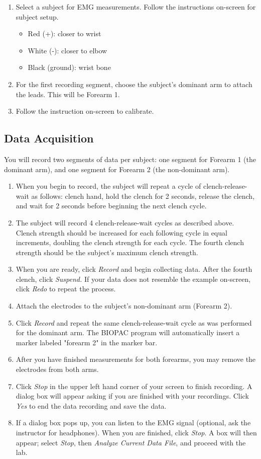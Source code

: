 \documentclass{article}
\begin{document}
\begin{enumerate}
	\item Select a subject for EMG measurements. Follow the instructions on-screen for subject setup.
		\begin{itemize}
			\item Red (+): closer to wrist
			\item White (-): closer to elbow
			\item Black (ground): wrist bone
		\end{itemize}
	\item For the first recording segment, choose the subject's dominant arm to attach the leads. This will be Forearm 1.
	\item Follow the instruction on-screen to calibrate.
\end{enumerate}

\subsection*{Data Acquisition}
You will record two segments of data per subject: one segment for Forearm 1 (the dominant arm), and one segment for Forearm 2 (the non-dominant arm).
\begin{enumerate}
	\item When you begin to record, the subject will repeat a cycle of clench-release-wait as follows: clench hand, hold the clench for 2 seconds, release the clench, and wait for 2 seconds before beginning the next clench cycle.
	\item The subject will record 4 clench-release-wait cycles as described above. Clench strength should be increased for each following cycle in equal increments, doubling the clench strength for each cycle. The fourth clench strength should be the subject's maximum clench strength.
	\item When you are ready, click \textit{Record} and begin collecting data. After the fourth clench, click \textit{Suspend.} If your data does not resemble the example on-screen, click \textit{Redo} to repeat the process.
	\item Attach the electrodes to the subject's non-dominant arm (Forearm 2).
	\item Click \textit{Record} and repeat the same clench-release-wait cycle as was performed for the dominant arm. The BIOPAC program will automatically insert a marker labeled "forearm 2" in the marker bar.
	\item After you have finished measurements for both forearms, you may remove the electrodes from both arms.
	\item Click \textit{Stop} in the upper left hand corner of your screen to finish recording. A dialog box will appear asking if you are finished with your recordings. Click \textit{Yes} to end the data recording and save the data.
	\item If a dialog box pops up, you can listen to the EMG signal (optional, ask the instructor for headphones). When you are finished, click \textit{Stop}. A box will then appear; select \textit{Stop}, then \textit{Analyze Current Data File}, and proceed with the lab.
\end{enumerate}
\end{document}
